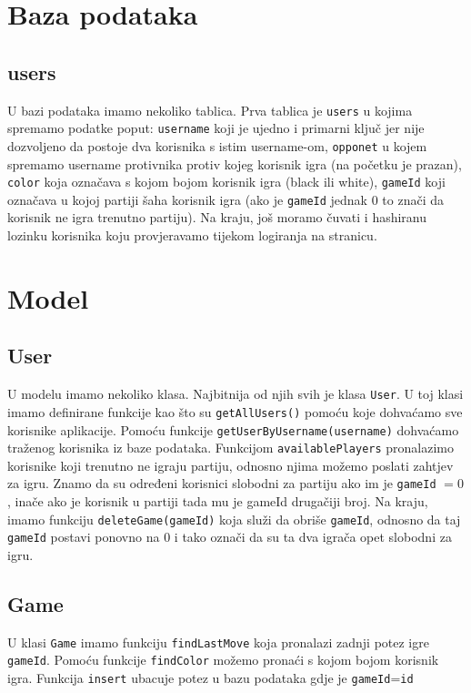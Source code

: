 \documentclass{article}
\begin{document}
\section{Baza podataka}

\subsection{users}
U bazi podataka imamo nekoliko tablica. Prva tablica je \verb|users| u kojima spremamo podatke poput: \verb|username| koji je ujedno i primarni ključ jer nije dozvoljeno da postoje dva korisnika s istim username-om, \verb|opponet| u kojem spremamo username protivnika protiv kojeg korisnik igra (na početku je prazan), \verb|color| koja označava s kojom bojom korisnik igra (black ili white), \verb|gameId| koji označava u kojoj partiji šaha korisnik igra (ako je \verb|gameId| jednak $0$ to znači da korisnik ne igra trenutno partiju). Na kraju, još moramo čuvati i hashiranu lozinku korisnika koju provjeravamo tijekom logiranja na stranicu.

\section{Model}

\subsection{User}
U modelu imamo nekoliko klasa. Najbitnija od njih svih je klasa \verb|User|. U toj klasi imamo definirane funkcije kao što su \verb|getAllUsers()| pomoću koje dohvaćamo sve korisnike aplikacije. Pomoću funkcije \verb|getUserByUsername(username)| dohvaćamo traženog korisnika iz baze podataka. Funkcijom \verb|availablePlayers| pronalazimo korisnike koji trenutno ne igraju partiju, odnosno njima možemo poslati zahtjev za igru. Znamo da su određeni korisnici slobodni za partiju ako im je \verb|gameId| $=0$, inače ako je korisnik u partiji tada mu je gameId drugačiji broj. Na kraju, imamo funkciju \verb|deleteGame(gameId)| koja služi da obriše \verb|gameId|, odnosno da taj \verb|gameId| postavi ponovno na $0$ i tako označi da su ta dva igrača opet slobodni za igru.

\subsection{Game}

U klasi \verb|Game| imamo funkciju \verb|findLastMove| koja pronalazi zadnji potez igre \verb|gameId|. Pomoću funkcije \verb|findColor| možemo pronaći s kojom bojom korisnik igra. Funkcija \verb|insert| ubacuje potez u bazu podataka gdje je \verb|gameId|=\verb|id|
\end{document}
